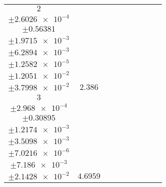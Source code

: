 \documentclass[8pt]{article}
\begin{document}
\begin{longtable}[l]{c c c c c c c c c}
$\num{2}$ & \begin{tabular}[c]{@{}c@{}}$\num{2.7562e-2}$ \\ $\pm\num{2.6026e-4}$\end{tabular} & \begin{tabular}[c]{@{}c@{}}$\num{-0.76663}$ \\ $\pm\num{0.56381}$\end{tabular} & \begin{tabular}[c]{@{}c@{}}$\num{-6.9249}$ \\ $\pm\num{1.9715e-3}$\end{tabular} & \begin{tabular}[c]{@{}c@{}}$\num{3.5408e+3}$ \\ $\pm\num{6.2894e-3}$\end{tabular} & \begin{tabular}[c]{@{}c@{}}$\num{7.0836}$ \\ $\pm\num{1.2582e-5}$\end{tabular} & \begin{tabular}[c]{@{}c@{}}$\num{1.1356}$ \\ $\pm\num{1.2051e-2}$\end{tabular} & \begin{tabular}[c]{@{}c@{}}$\num{4.0695}$ \\ $\pm\num{3.7998e-2}$\end{tabular} & $\num{2.386}$\\
$\num{3}$ & \begin{tabular}[c]{@{}c@{}}$\num{5.7559e-2}$ \\ $\pm\num{2.968e-4}$\end{tabular} & \begin{tabular}[c]{@{}c@{}}$\num{0.73628}$ \\ $\pm\num{0.30895}$\end{tabular} & \begin{tabular}[c]{@{}c@{}}$\num{-0.49569}$ \\ $\pm\num{1.2174e-3}$\end{tabular} & \begin{tabular}[c]{@{}c@{}}$\num{3.5472e+3}$ \\ $\pm\num{3.5098e-3}$\end{tabular} & \begin{tabular}[c]{@{}c@{}}$\num{7.0964}$ \\ $\pm\num{7.0216e-6}$\end{tabular} & \begin{tabular}[c]{@{}c@{}}$\num{1.3113}$ \\ $\pm\num{7.186e-3}$\end{tabular} & \begin{tabular}[c]{@{}c@{}}$\num{4.2895}$ \\ $\pm\num{2.1428e-2}$\end{tabular} & $\num{4.6959}$\\

\end{longtable}
\end{document}
